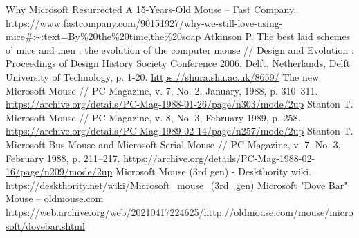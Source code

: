 \documentclass[11pt, a4paper]{article}
\begin{document}
\begin{thebibliography}{9}
 Why Microsoft Resurrected A 15-Years-Old Mouse -- Fast Company. \url{https://www.fastcompany.com/90151927/why-we-still-love-using-mice#:~:text=By%20the%20time,the%20soap}
 Atkinson P. The best laid schemes o’ mice and men : the evolution of the computer mouse // Design and Evolution : Proceedings of Design History Society Conference 2006. Delft, Netherlands, Delft University of Technology, p. 1-20. \url{https://shura.shu.ac.uk/8659/}
 The new Microsoft Mouse // PC Magazine, v. 7, No. 2, January, 1988, p. 310--311. \url{https://archive.org/details/PC-Mag-1988-01-26/page/n303/mode/2up}
 Stanton T. Microsoft Mouse // PC Magazine, v. 8, No. 3, February 1989, p. 258. \url{https://archive.org/details/PC-Mag-1989-02-14/page/n257/mode/2up}
 Stanton T. Microsoft Bus Mouse and Microsoft Serial Mouse // PC Magazine, v. 7, No. 3, February 1988, p. 211--217. \url{https://archive.org/details/PC-Mag-1988-02-16/page/n209/mode/2up}
 Microsoft Mouse (3rd gen) - Deskthority wiki. \url{https://deskthority.net/wiki/Microsoft_mouse_(3rd_gen)}
 Microsoft "Dove Bar" Mouse  -- oldmouse.com \url{https://web.archive.org/web/20210417224625/http://oldmouse.com/mouse/microsoft/dovebar.shtml}
\end{thebibliography}
\end{document}
